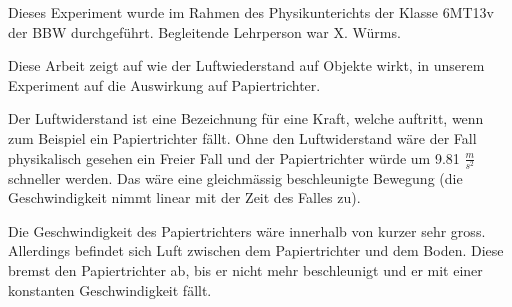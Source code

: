 Dieses Experiment wurde im Rahmen des Physikunterichts der Klasse 6MT13v der BBW durchgeführt. Begleitende Lehrperson war X. Würms.

Diese Arbeit zeigt auf wie der Luftwiederstand auf Objekte wirkt, in unserem Experiment auf die Auswirkung auf Papiertrichter.

Der Luftwiderstand ist eine Bezeichnung für eine Kraft, welche auftritt, wenn zum Beispiel ein Papiertrichter fällt. Ohne den Luftwiderstand wäre der Fall physikalisch gesehen ein Freier Fall und der Papiertrichter würde um 9.81 $ \frac{m}{s^{2}} $ schneller werden. Das wäre eine gleichmässig beschleunigte Bewegung (die Geschwindigkeit nimmt linear mit der Zeit des Falles zu). 

Die Geschwindigkeit des Papiertrichters wäre innerhalb von kurzer sehr gross. Allerdings befindet sich Luft zwischen dem Papiertrichter und dem Boden. Diese bremst den Papiertrichter ab, bis er nicht mehr beschleunigt und er mit einer konstanten Geschwindigkeit fällt.